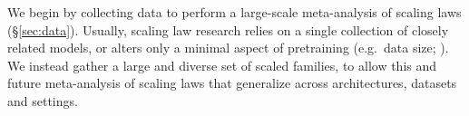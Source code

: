 \documentclass{article}
\theoremstyle{plain}
\theoremstyle{definition}
\theoremstyle{remark}
\newcommand{\jda}[1]{{\color{purple}[jda: #1]}}
\begin{document}

We begin by collecting data to perform a large-scale meta-analysis of scaling laws (\S \ref{sec:data}). Usually, scaling law research relies on a single collection of closely related models, or alters only a minimal aspect of pretraining (e.g.\ data size; \citealp{datablations}). We instead gather a large and diverse set of scaled families, to allow this and future meta-analysis of scaling laws that generalize across architectures, datasets and settings.
\end{document}

